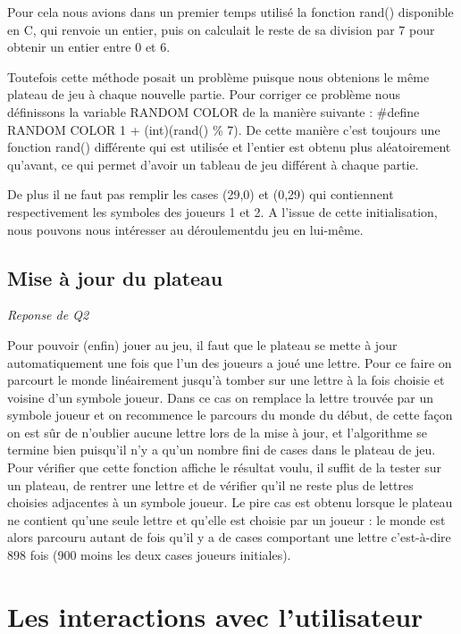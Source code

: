 \documentclass[a4paper,11pt]{article}
\begin{document}
Pour cela nous avions dans un premier temps  utilisé la fonction rand() 
disponible en C, qui renvoie un entier, puis on calculait le reste de sa division 
par 7 pour obtenir un entier entre 0 et 6. 

Toutefois cette méthode posait un problème puisque nous obtenions le même plateau 
de jeu à chaque nouvelle partie. Pour corriger ce problème nous définissons
la variable RANDOM COLOR de la manière suivante : \#define RANDOM COLOR 1 + (int)(rand() \% 7).
De cette manière c'est toujours une fonction rand() différente qui est utilisée et 
l'entier est obtenu plus aléatoirement qu'avant, ce qui permet d'avoir un tableau
de jeu différent à chaque partie.

De plus il ne faut pas remplir les cases (29,0) et (0,29) qui contiennent 
respectivement les symboles des joueurs 1 et 2. A l'issue de cette initialisation, 
nous pouvons nous intéresser au déroulementdu jeu en lui-même.

\subsection{Mise à jour du plateau}
\emph{Reponse de Q2}

Pour pouvoir (enfin) jouer au jeu, il faut que le plateau se mette à jour
automatiquement une fois que l'un des joueurs a joué une lettre. Pour ce faire
on parcourt le monde linéairement jusqu'à tomber sur une lettre à la fois choisie et
voisine d'un symbole joueur. Dans ce cas on remplace la lettre trouvée par un symbole
joueur et on recommence le parcours du monde du début, de cette façon on est sûr de 
n'oublier aucune lettre lors de la mise à jour, et l'algorithme se termine bien 
puisqu'il n'y a qu'un nombre fini de cases dans le plateau de jeu. Pour vérifier
que cette fonction affiche le résultat voulu, il suffit de la tester sur un plateau, 
de rentrer une lettre et de vérifier qu'il ne reste plus de lettres choisies adjacentes
à un symbole joueur. Le pire cas est obtenu lorsque le plateau ne contient qu'une seule
lettre et qu'elle est choisie par un joueur : le monde est alors parcouru autant de fois
qu'il y a de cases comportant une lettre c'est-à-dire 898 fois (900 moins les deux cases
joueurs initiales). 



\section{Les interactions avec l'utilisateur}
\end{document}
